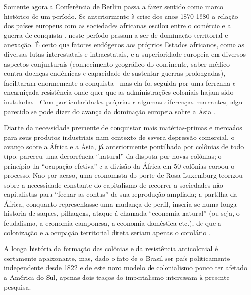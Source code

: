Somente agora a Conferência de Berlim passa a fazer sentido como marco histórico de um período. Se anteriormente à crise dos anos 1870-1880 a relação dos países europeus com as sociedades africanas oscilou entre o comércio e a guerra de conquista \cite{ogot_hisaf5_2010,AJAYI2010}, neste período passam a ser de dominação territorial e anexação. É certo que fatores endógenos aos próprios Estados africanos, como as diversas lutas interestatais e intraestatais, e a superioridade europeia em diversos aspectos conjunturais (conhecimento geográfico do continente, saber médico contra doenças endêmicas e capacidade de sustentar guerras prolongadas), facilitaram enormemente a conquista \cite{uzoigwe_partilha_2010}, mas ela foi seguida por uma ferrenha e encarniçada resistência onde quer que as administrações coloniais hajam sido instaladas \cite[p.~51-318]{boahen_hisaf7_2010}. Com particularidades próprias e algumas diferenças marcantes, algo parecido se pode dizer do avanço da dominação europeia sobre a Ásia \cite{panikkar_domasia_1977}. 

Diante da necessidade premente de conquistar mais matérias-primas e mercados para seus produtos industriais num contexto de severa depressão comercial, o avanço sobre a África e a Ásia, já anteriormente pontilhada por colônias de todo tipo, pareceu uma decorrência ``natural'' da disputa por novas colônias; o princípio da ``ocupação efetiva'' e a divisão da África em 50 colônias coroou o processo. Não por acaso, uma economista do porte de Rosa Luxemburg teorizou sobre a necessidade constante do capitalismo de recorrer a sociedades não-capitalistas para ``fechar as contas'' de sua reprodução ampliada; a partilha da África, conquanto representasse uma mudança de perfil, inseria-se numa longa história de saques, pilhagens, ataque à chamada ``economia natural'' (ou seja, o feudalismo, a economia camponesa, a economia doméstica etc.), de que a colonização e a ocupação territorial direta seriam apenas o corolário \cite{luxemburg_acumula_1985}.

A longa história da formação das colônias e da resistência anticolonial é certamente apaixonante, mas, dado o fato de o Brasil ser país politicamente independente desde 1822 e de este novo modelo de colonialismo pouco ter afetado a América do Sul, apenas dois traços do imperialismo interessam à presente pesquisa.

